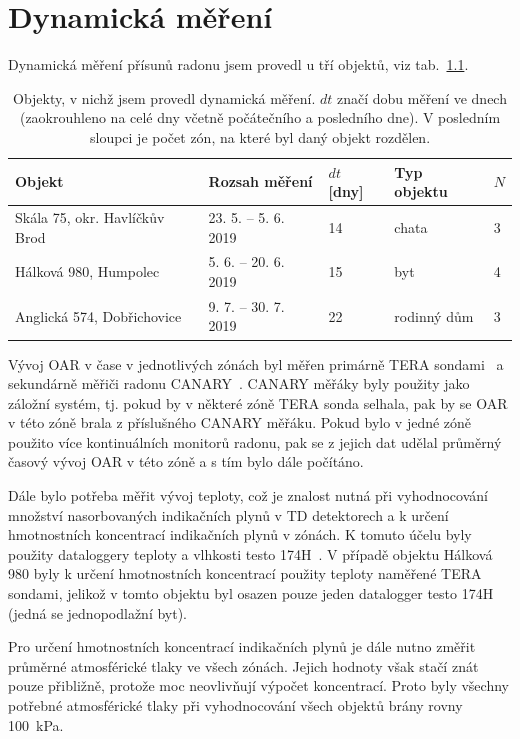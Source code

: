 \chapter{Dynamická měření}\label{navesti:dynamickaMereni}
Dynamická měření přísunů radonu jsem provedl u tří objektů, viz tab.~\ref{tab:dynMer_prehled}.
\begin{table}[ht]
	\centering
	\caption{Objekty, v nichž jsem provedl dynamická měření. $dt$ značí dobu měření ve dnech (zaokrouhleno na celé dny včetně počátečního a posledního dne). V posledním sloupci je počet zón, na které byl daný objekt rozdělen.}
	\label{tab:dynMer_prehled}
	\begin{tabular}{lllll}
		\toprule
		Objekt & Rozsah měření & $dt$ [dny] & Typ objektu &$N$\\
		\midrule
		Skála 75, okr. Havlíčkův Brod & 23. 5. -- 5. 6. 2019 & 14 & chata & 3\\
		Hálková 980, Humpolec & 5. 6. -- 20. 6. 2019 & 15 & byt & 4\\
		Anglická 574, Dobřichovice & 9. 7. -- 30. 7. 2019 & 22 & rodinný dům & 3\\
		\bottomrule
	\end{tabular}
\end{table}

Vývoj OAR v čase v jednotlivých zónách byl měřen primárně TERA sondami~\cite{tera} a sekundárně měřiči radonu CANARY~\cite{canary}. CANARY měřáky byly použity jako záložní systém, tj. pokud by v některé zóně  TERA sonda selhala, pak by se OAR v této zóně brala z příslušného CANARY měřáku. %
Pokud bylo v jedné zóně použito více kontinuálních monitorů radonu, pak se z jejich dat udělal průměrný časový vývoj OAR v této zóně a s tím bylo dále počítáno.

Dále bylo potřeba měřit vývoj teploty, což je znalost nutná při vyhodnocování množství nasorbovaných indikačních plynů v TD detektorech a k určení hmotnostních koncentrací indikačních plynů  v zónách. K tomuto účelu byly použity dataloggery teploty a vlhkosti testo 174H~\cite{testo}. V případě objektu Hálková 980 byly k určení hmotnostních koncentrací použity teploty naměřené TERA sondami, jelikož v tomto objektu byl osazen pouze jeden datalogger testo 174H (jedná se jednopodlažní byt). 

Pro určení hmotnostních koncentrací indikačních plynů je dále nutno změřit průměrné atmosférické tlaky ve všech zónách. Jejich hodnoty však stačí znát pouze přibližně, protože moc neovlivňují výpočet koncentrací. Proto byly všechny potřebné atmosférické tlaky při vyhodnocování všech objektů brány rovny \SI{100}{kPa}.

